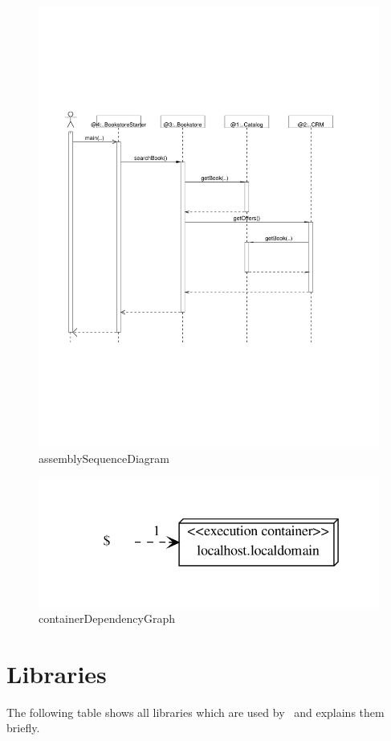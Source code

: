 	\begin{figure}[H]
		\centering
		\includegraphics[height=0.5\textheight]{images/assemblySequenceDiagram}
		\caption{assemblySequenceDiagram}
	\end{figure}
	
	\begin{figure}[H]
		\centering
		\includegraphics[height=0.5\textheight]{images/containerDependencyGraph}
		\caption{containerDependencyGraph}
	\end{figure}
  
  
\newpage
  \section{Libraries}
    The following table shows all libraries which are used by \Kieker\ and explains them briefly.
    

